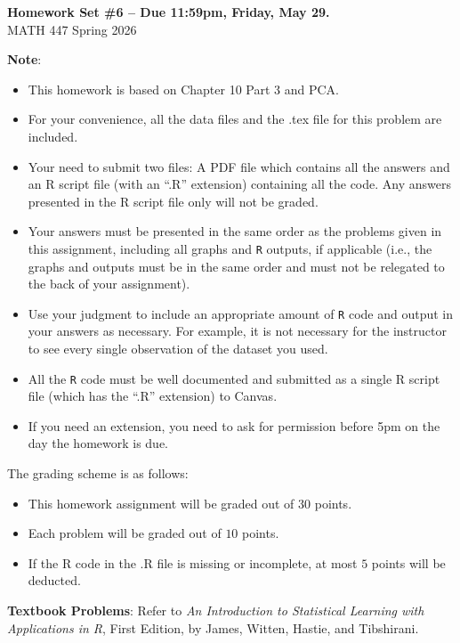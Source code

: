 \documentclass[12pt]{article}
\begin{document}
\newcommand{\bm}[1]{\mbox{\boldmath$#1$}}

\begin{center}{\bf Homework Set \#6 -- Due 11:59pm, Friday, May 29.} \\ {\sc MATH 447 Spring 2026}\end{center}
\textbf{Note}: 
\begin{itemize}
\item This homework is based on Chapter 10 Part 3 and PCA. 
\item For your convenience, all the data files and the .tex file for this problem are included.
\item Your need to submit two files: A PDF file which contains all the answers and an R script file (with an ``.R'' extension) containing all the code.  Any answers presented in the R script file only will not be graded.
\item Your answers must be presented in the same order as the problems given in this assignment, including all graphs and {\tt R} outputs, if applicable (i.e., the graphs and outputs must be in the same order and must not be relegated to the back of your assignment). 
\item Use your judgment to include an appropriate amount of {\tt R} code and output in your answers as necessary. For example, it is not necessary for the instructor to see every single observation of the dataset you used.
\item All the {\tt R} code must be well documented and submitted as a single R script file (which has the ``.R'' extension) to Canvas. 
\item If you need an extension, you need to ask for permission before 5pm on the day the homework is due.
\end{itemize}

The grading scheme is as follows:
\begin{itemize}
\item This homework assignment will be graded out of $30$ points.
\item Each problem will be graded out of $10$ points.
\item If the R code in the .R file is missing or incomplete, at most $5$ points will be deducted.
\end{itemize}

\textbf{Textbook Problems}: Refer to \textit{An Introduction to Statistical Learning with Applications in R}, First Edition, by James, Witten, Hastie, and Tibshirani.
\end{document}
